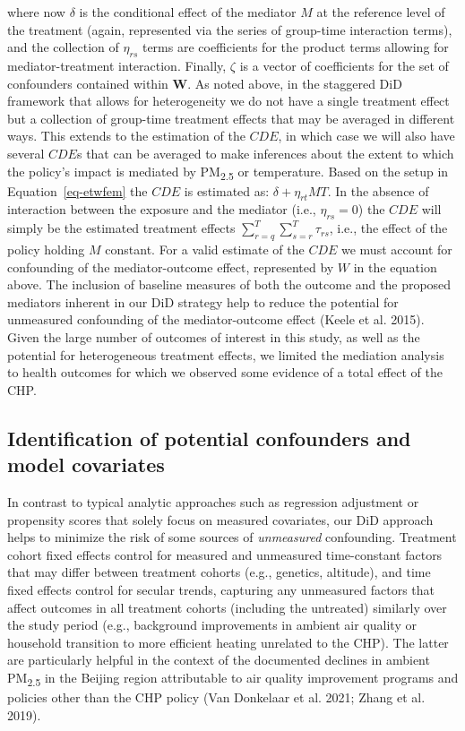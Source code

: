 \documentclass[
  letterpaper,
  DIV=11,
  numbers=noendperiod]{scrartcl}
\begin{document}
where now \(\delta\) is the conditional effect of the mediator \(M\) at
the reference level of the treatment (again, represented via the series
of group-time interaction terms), and the collection of \(\eta_{rs}\)
terms are coefficients for the product terms allowing for
mediator-treatment interaction. Finally, \(\zeta\) is a vector of
coefficients for the set of confounders contained within \(\mathbf{W}\).
As noted above, in the staggered DiD framework that allows for
heterogeneity we do not have a single treatment effect but a collection
of group-time treatment effects that may be averaged in different ways.
This extends to the estimation of the \(CDE\), in which case we will
also have several \(CDE\)s that can be averaged to make inferences about
the extent to which the policy's impact is mediated by
PM\textsubscript{2.5} or temperature. Based on the setup in
Equation~\ref{eq-etwfem} the \(CDE\) is estimated as:
\(\delta + \eta_{rt}MT\). In the absence of interaction between the
exposure and the mediator (i.e., \(\eta_{rs}=0\)) the \(CDE\) will
simply be the estimated treatment effects
\(\sum_{r=q}^{T} \sum_{s=r}^{T} \tau_{rs}\), i.e., the effect of the
policy holding \(M\) constant. For a valid estimate of the \(CDE\) we
must account for confounding of the mediator-outcome effect, represented
by \(W\) in the equation above. The inclusion of baseline measures of
both the outcome and the proposed mediators inherent in our DiD strategy
help to reduce the potential for unmeasured confounding of the
mediator-outcome effect (Keele et al. 2015). Given the large number of
outcomes of interest in this study, as well as the potential for
heterogeneous treatment effects, we limited the mediation analysis to
health outcomes for which we observed some evidence of a total effect of
the CHP.

\subsection{Identification of potential confounders and model
covariates}\label{identification-of-potential-confounders-and-model-covariates}

In contrast to typical analytic approaches such as regression adjustment
or propensity scores that solely focus on measured covariates, our DiD
approach helps to minimize the risk of some sources of \emph{unmeasured}
confounding. Treatment cohort fixed effects control for measured and
unmeasured time-constant factors that may differ between treatment
cohorts (e.g., genetics, altitude), and time fixed effects control for
secular trends, capturing any unmeasured factors that affect outcomes in
all treatment cohorts (including the untreated) similarly over the study
period (e.g., background improvements in ambient air quality or
household transition to more efficient heating unrelated to the CHP).
The latter are particularly helpful in the context of the documented
declines in ambient PM\textsubscript{2.5} in the Beijing region
attributable to air quality improvement programs and policies other than
the CHP policy (Van Donkelaar et al. 2021; Zhang et al. 2019).
\end{document}
